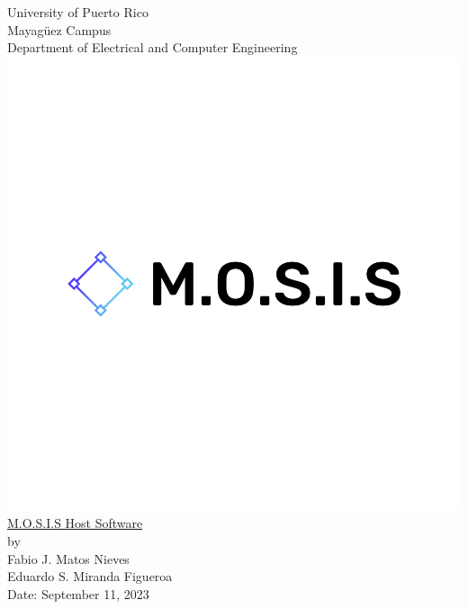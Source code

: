 \begin{titlepage}
  \begin{center}
    \large{University of Puerto Rico\\
    Mayagüez Campus\\
    \vspace{\baselineskip}
    Department of Electrical and Computer Engineering\\}
  \vspace{1.0cm}
  \includegraphics[scale=0.2]{../M.O.S.I.S Logo/default.png}
    \Huge{\underline{M.O.S.I.S Host Software}\\}
    \vspace{1.5\baselineskip}
    \large by\\
    \vspace{\baselineskip}
    Fabio J. Matos Nieves\\
    Eduardo S. Miranda Figueroa\\
    \vspace{4.0cm}
    Date: September 11, 2023\\
    \normalsize

  \end{center}
\end{titlepage}
